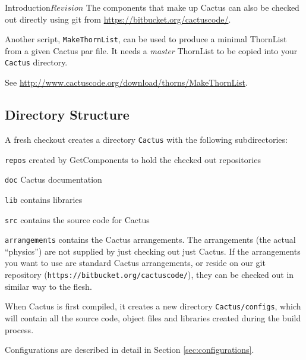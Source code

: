 \begin{cactuspart}{Introduction}{}{$Revision$}
The components that make up Cactus can also be checked out directly
using git from \url{https://bitbucket.org/cactuscode/}.

Another script, \texttt{MakeThornList}, can be used to produce a minimal
ThornList from a given Cactus par file.  It needs a \emph{master} ThornList
to be copied into your \texttt{Cactus} directory.

See \url{http://www.cactuscode.org/download/thorns/MakeThornList}.



\subsection{Directory Structure}
\label{sec:dist}

A fresh checkout creates a directory \texttt{Cactus} with the
following subdirectories:

\begin{Lentry}

\item[\texttt{repos}] created by GetComponents to hold the checked out
repositories

\item[\texttt{doc}] Cactus documentation

\item[\texttt{lib}] contains libraries

\item[\texttt{src}] contains the source code for Cactus

\item [\texttt{arrangements}] contains the Cactus arrangements. The arrangements
  (the actual ``physics'') are not supplied by just checking out just Cactus.
  If the arrangements you want to use are standard Cactus arrangements, or
  reside on our git repository (\texttt{https://bitbucket.org/cactuscode/}),
  they can be checked out in similar way to the flesh.
\end{Lentry}

When Cactus is first compiled, it creates a new directory
\texttt{Cactus/configs}, which will contain all the source code, object files
and libraries created during the build process.

Configurations are described in detail in Section \ref{sec:configurations}.



\end{cactuspart}
